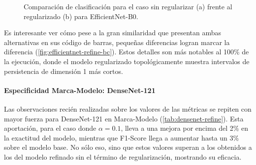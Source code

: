 \begin{figure}[H]
\begin{subfigure}
		\caption{Ejemplo bien clasificado para el modelo EfficientNet-B0 refinado
			con regularización para Marca.}
		\label{fig:ex-efficientnet-refine-2}
	\end{subfigure}
	\caption{Comparación de clasificación para el caso sin regularizar (a) frente
		al regularizado (b) para EfficientNet-B0.}
	\label{fig:ex-efficientnet-refine}
\end{figure}

Es interesante ver cómo pese a la gran similaridad que presentan ambas
alternativas en sus código de barras, pequeñas diferencias logran marcar la diferencia
(\autoref{fig:efficientnet-refine-bc}). Estos detalles son más notables al 100\%
de la ejecución, donde el modelo regularizado topológicamente muestra intervalos
de persistencia de dimensión 1 más cortos.

\paragraph{Especificidad Marca-Modelo: DenseNet-121}

Las observaciones recién realizadas sobre los valores de las métricas se repiten
con mayor fuerza para DenseNet-121 en Marca-Modelo (\autoref{tab:densenet-refine}).
Esta aportación, para el caso donde $\alpha = 0.1$, lleva a una mejora por encima
del 2\% en la exactitud del modelo, mientras que F1-Score llega a aumentar hasta
un 3\% sobre el modelo base. No sólo eso, sino que estos valores superan a los
obtenidos a los del modelo refinado sin el término de regularización, mostrando su
eficacia.

